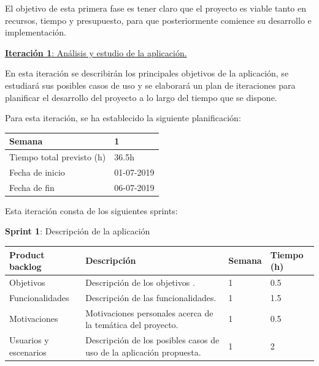 El objetivo de esta primera fase es tener claro que el proyecto es viable tanto en recursos, tiempo y presupuesto, para que posteriormente comience su desarrollo e implementación.



\large{\underline{\textbf{Iteración 1}: Análisis y estudio de la aplicación.}}
\vspace{0.3cm}

\normalsize

En esta iteración se describirán los principales objetivos de la aplicación, se estudiará sus posibles casos de uso y se elaborará un plan de iteraciones para planificar el desarrollo del proyecto a lo largo del tiempo que se dispone.

Para esta iteración, se ha establecido la siguiente planificación:

\begin{table}[h!]
\centering
\begin{tabular}{|p{5cm}|p{4cm}|}
 \hline
	\cellcolor[gray]{0.9} Semana  & 1\\ \hline
	\cellcolor[gray]{0.9} Tiempo total previsto (h)  & 36.5h \\ \hline
	\cellcolor[gray]{0.9} Fecha de inicio  & 01-07-2019 \\ \hline
	\cellcolor[gray]{0.9} Fecha de fin  & 06-07-2019 \\ \hline
		
\end{tabular}
\end{table}

Esta iteración consta de los siguientes sprints:

\textbf{Sprint 1}: Descripción de la aplicación


\begin{table}[h!]
\begin{tabular}{|p{4cm}|p{7.2cm}|p{1.3cm}|p{2.1cm}|}
\hline
\rowcolor[HTML]{9B9B9B} 
{\color[HTML]{FFFFFF} Product backlog} & {\color[HTML]{FFFFFF} Descripción}                                  & {\color[HTML]{FFFFFF} Semana} & {\color[HTML]{FFFFFF}Tiempo (h)} \\ \hline
Objetivos                              & Descripción de los objetivos .                                       & 1                             & 0.5                                    \\ \hline
Funcionalidades                        & Descripción de las funcionalidades.                                 & 1                             & 1.5                                    \\ \hline
Motivaciones                           & Motivaciones personales acerca de la temática del proyecto.          & 1                             & 0.5                                    \\ \hline
Usuarios y escenarios                  & Descripción de los posibles casos de uso de la aplicación propuesta. & 1                             & 2                                      \\ \hline
\end{tabular}
\end{table}

